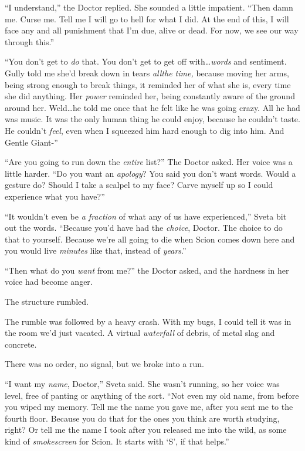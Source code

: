 ``I understand,'' the Doctor replied.  She sounded a little impatient.  ``Then damn me.  Curse me.  Tell me I will go to hell for what I did.  At the end of this, I will face any and all punishment that I'm due, alive or dead.  For now, we see our way through this.''



``You don't get to \emph{do} that.  You don't get to get off with\ldots \emph{words }and sentiment.  Gully told me she'd break down in tears \emph{all}\emph{the time, }because moving her arms, being strong enough to break things, it reminded her of what she is, every time she did anything.  Her \emph{power }reminded her, being constantly aware of the ground around her.  Weld\ldots he told me once that he felt like he was going crazy.  All he had was music.  It was the only\emph{ }human thing he could enjoy, because he couldn't taste.  He couldn't \emph{feel}, even when I squeezed him hard enough to dig into him.  And Gentle Giant-''



``Are you going to run down the \emph{entire} list?''  The Doctor asked.  Her voice was a little harder.  ``Do you want an \emph{apology}?  You said you don't want words.  Would a gesture do?  Should I take a scalpel to my face?  Carve myself up so I could experience what you have?''



``It wouldn't even be \emph{a fraction }of what any of us have experienced,'' Sveta bit out the words.  ``Because you'd have had the \emph{choice}, Doctor.  The choice to do that to yourself.  Because we're all going to die when Scion comes down here and you would live \emph{minutes} like that, instead of \emph{years}.''



``Then what do you \emph{want} from me?''  the Doctor asked, and the hardness in her voice had become anger.



The structure rumbled.



The rumble was followed by a heavy crash.  With my bugs, I could tell it was in the room we'd just vacated.  A virtual \emph{waterfall} of debris, of metal slag and concrete.



There was no order, no signal, but we broke into a run.



``I want my \emph{name}, Doctor,'' Sveta said.  She wasn't running, so her voice was level, free of panting or anything of the sort.  ``Not even my old name, from before you wiped my memory.  Tell me the name you gave me, after you sent me to the fourth floor.  Because you do that for the ones you think are worth studying, right?  Or tell me the name I took after you released me into the wild, as some kind of \emph{smokescreen} for Scion.  It starts with `S', if that helps.''



